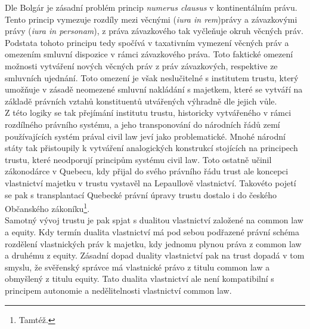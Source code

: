 \documentclass{article}
\begin{document}
Dle Bolgár je zásadní problém princip \textit{numerus clausus} v kontinentálním právu. Tento princip vymezuje rozdíly mezi věcnými (\textit{iura in rem})právy a závazkovými právy (\textit{iura in personam}), z práva závazkového tak vyčleňuje okruh věcných práv. Podstata tohoto principu tedy spočívá v taxativním vymezení věcných práv a omezením smluvní dispozice v rámci závazkového práva. Toto faktické omezení možnosti vytváření nových věcných práv z práv závazkových, respektive ze smluvních ujednání. Toto omezení je však neslučitelné s institutem trustu, který umožňuje v zásadě neomezené smluvní nakládání s majetkem, které se vytváří na základě právních vztahů konstituentů utvářených výhradně dle jejich vůle.\\

Z této logiky se tak přejímání institutu trustu, historicky vytvářeného v rámci rozdílného právního systému, a jeho transponování do národních řádů zemí používajících systém prával civil law jeví jako problematické. Mnohé národní státy tak přistoupily k vytváření analogických konstrukcí stojících na principech trustu, které neodporují principům systému civil law. Toto ostatně učinil zákonodárce v Quebecu, kdy přijal do svého právního řádu trust ale koncepci vlastnictví majetku v trustu vystavěl na Lepaullově vlastnictví. Takovéto pojetí se pak s transplantací Quebecké právní úpravy trustu dostalo i do českého Občanského zákoníku\footnote{Tamtéž.}.\\

Samotný vývoj trustu je pak spjat s dualitou vlastnictví založené na common law a equity. Kdy termín dualita vlastnictví má pod sebou podřazené právní schéma rozdělení vlastnických práv k majetku, kdy jednomu plynou práva z common law a druhému z equity. Zásadní dopad duality vlastnictví pak na trust dopadá v tom smyslu, že svěřenský správce má vlastnické právo z titulu common law a obmyšlený z titulu equity. Tato dualita vlastnictví ale není kompatibilní s principem autonomie a nedělitelnosti vlastnictví common law. \\
\end{document}
